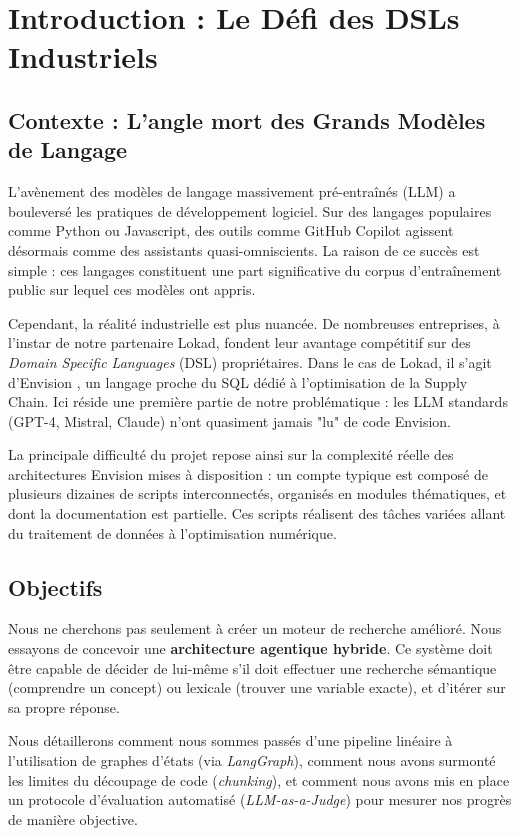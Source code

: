 \section{Introduction : Le Défi des DSLs Industriels}

\subsection{Contexte : L'angle mort des Grands Modèles de Langage}

L'avènement des modèles de langage massivement pré-entraînés (LLM) a bouleversé les pratiques de développement logiciel. Sur des langages populaires comme Python ou Javascript, des outils comme GitHub Copilot agissent désormais comme des assistants quasi-omniscients. La raison de ce succès est simple : ces langages constituent une part significative du corpus d'entraînement public sur lequel ces modèles ont appris.

Cependant, la réalité industrielle est plus nuancée. De nombreuses entreprises, à l'instar de notre partenaire Lokad, fondent leur avantage compétitif sur des \textit{Domain Specific Languages} (DSL) propriétaires. Dans le cas de Lokad, il s'agit d'Envision \cite{LokadEnvision}, un langage proche du SQL dédié à l'optimisation de la Supply Chain. Ici réside une première partie de notre problématique : les LLM standards (GPT-4, Mistral, Claude) n'ont quasiment jamais "lu" de code Envision.

La principale difficulté du projet repose ainsi sur la complexité réelle des architectures Envision mises à disposition : un
compte typique est composé de plusieurs dizaines de scripts interconnectés, organisés en modules thématiques,
et dont la documentation est partielle. Ces scripts réalisent des tâches variées allant du traitement de données
à l’optimisation numérique.

\subsection{Objectifs}

Nous ne cherchons pas seulement à créer un moteur de recherche amélioré. Nous essayons de concevoir une \textbf{architecture agentique hybride}. Ce système doit être capable de décider de lui-même s'il doit effectuer une recherche sémantique (comprendre un concept) ou lexicale (trouver une variable exacte), et d'itérer sur sa propre réponse.

Nous détaillerons comment nous sommes passés d'une pipeline linéaire à l'utilisation de graphes d'états (via \textit{LangGraph}), comment nous avons surmonté les limites du découpage de code (\textit{chunking}), et comment nous avons mis en place un protocole d'évaluation automatisé (\textit{LLM-as-a-Judge}) pour mesurer nos progrès de manière objective.